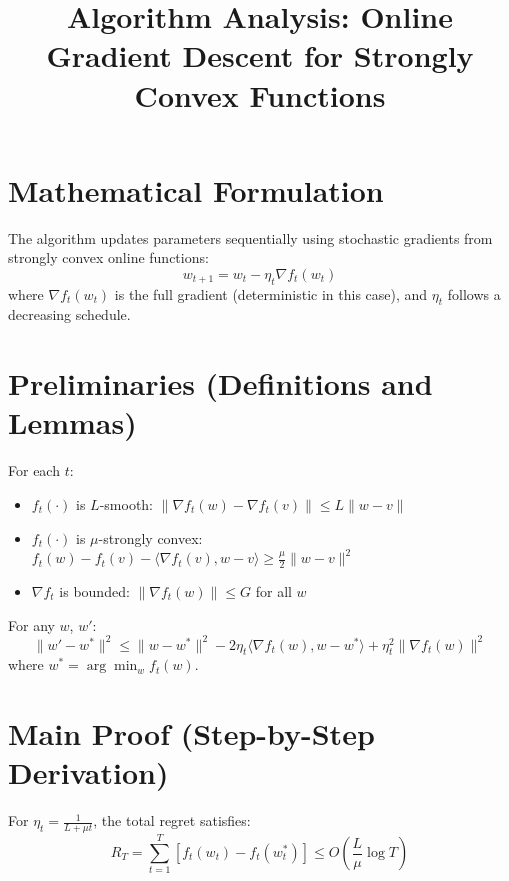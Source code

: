 \documentclass{article}
\title{Algorithm Analysis: Online Gradient Descent for Strongly Convex Functions}
\author{}
\date{}
\begin{document}
\maketitle

\section*{Mathematical Formulation}
The algorithm updates parameters sequentially using stochastic gradients from strongly convex online functions:
\[
w_{t+1} = w_t - \eta_t \nabla f_t(w_t)
\]
where \( \nabla f_t(w_t) \) is the full gradient (deterministic in this case), and \( \eta_t \) follows a decreasing schedule.

\section*{Preliminaries (Definitions and Lemmas)}
\begin{assumption}
For each \( t \):
\begin{itemize}
    \item \( f_t(\cdot) \) is \( L \)-smooth: \( \|\nabla f_t(w) - \nabla f_t(v)\| \leq L\|w - v\| \)
    \item \( f_t(\cdot) \) is \( \mu \)-strongly convex: \( f_t(w) - f_t(v) - \langle \nabla f_t(v), w - v \rangle \geq \frac{\mu}{2}\|w - v\|^2 \)
    \item \( \nabla f_t \) is bounded: \( \|\nabla f_t(w)\| \leq G \) for all \( w \)
\end{itemize}
\end{assumption}

\begin{lemma}
For any \( w \), \( w' \):
\[
\|w' - w^*\|^2 \leq \|w - w^*\|^2 - 2\eta_t \langle \nabla f_t(w), w - w^* \rangle + \eta_t^2 \|\nabla f_t(w)\|^2
\]
where \( w^* = \arg\min_w f_t(w) \).
\end{lemma}

\section*{Main Proof (Step-by-Step Derivation)}
\begin{theorem}
For \( \eta_t = \frac{1}{L + \mu t} \), the total regret satisfies:
\[
R_T = \sum_{t=1}^T \left[ f_t(w_t) - f_t(w_t^*) \right] \leq O\left( \frac{L}{\mu} \log T \right)
\]
\end{theorem}
\end{document}

